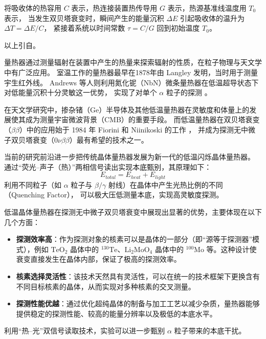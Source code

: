 \documentclass[type=master]{fduthesis}
\begin{document}
将吸收体的热容用 $C$ 表示，热连接装置热传导用 $G$ 表示，热源基准线温度用 $T_0$ 表示，
当发生双贝塔衰变时，瞬间产生的能量沉积 $\Delta E$ 引起吸收体的温升为 $\Delta T = \Delta E / C$，
紧接着系统以时间常数 $\tau = C / G$ 回到初始温度 $T_0$。


{\color{green} 以上引自}\cite{Ma2020Majorana}。

量热器通过测量辐射在装置中产生的热量来探索辐射的性质，在粒子物理与天文学中有广泛应用。
室温工作的量热器最早在1878年由 Langley \cite{Langley1880} 发明，当时用于测量宇生红外线。
Andrews 等人则利用氮化铌（NbN）微条量热器在低温超导状态下对低能量沉积十分灵敏这一优势，
实现了对单个 $\alpha$ 粒子的探测 \cite{Andrews1949}。

在天文学研究中，掺杂锗（Ge）半导体\cite{Estermann1950}及其他低温量热器在灵敏度和体量上的发展使其成为测量宇宙微波背景（CMB）的重要手段。
而低温量热器在双贝塔衰变（$\beta\beta$）中的应用始于 1984 年 Fiorini 和 Niinikoski 的工作 \cite{Fiorini1984}，
并成为探测无中微子双贝塔衰变（$0\nu\beta\beta$）最有希望的技术之一。

当前的研究前沿进一步把传统晶体量热器发展为新一代的低温闪烁晶体量热器。
通过“荧光--声子（热）”两相信号读出实现本底甄别，其原理如下：
\begin{equation}
    E_{total} = E_{heat} + E_{light}
\end{equation}
利用不同粒子（如 $\alpha$ 粒子与 $\beta/\gamma$ 射线）在晶体中产生光热比例的不同（Quenching Factor），
可以极大压低测量本底，实现高灵敏度探测。

低温晶体量热器在探测无中微子双贝塔衰变中展现出显著的优势，主要体现在以下几个方面：

\begin{itemize}
    \item \textbf{探测效率高}：作为探测对象的核素可以是晶体的一部分（即“源等于探测器”模式），例如 $\text{TeO}_2$ 晶体中的 $^{130}\text{Te}$、$\text{Li}_2\text{MoO}_4$ 晶体中的 $^{100}\text{Mo}$ 等。这种设计使衰变直接发生在晶体内部，保证了极高的探测效率。
    
    \item \textbf{核素选择灵活性}：该技术天然具有灵活性，可以在统一的技术框架下更换含有不同目标核素的晶体，从而实现对多种核素的交叉测量。
    
    \item \textbf{探测性能优越}：通过优化超纯晶体的制备与加工工艺以减少杂质，量热器能够提供稳定的探测性能、较高的能量分辨率以及极低的本底水平。
\end{itemize}

利用“热--光”双信号读取技术，实验可以进一步甄别 $\alpha$ 粒子带来的本底干扰。
\end{document}
